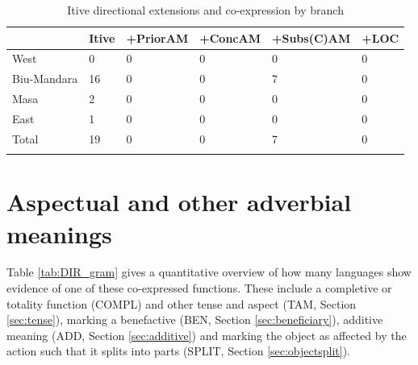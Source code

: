 \begin{table}
	\caption{Itive directional extensions and co-expression by branch}
	\label{tab:itive_plusTABLE}
	\begin{tabular}{llllll} %
		\lsptoprule
		{} &  Itive &  +PriorAM &  +ConcAM &  +Subs(C)AM &  +LOC \\
		\midrule
		West &      0 &         0 &        0 &           0 &     0 \\
		Biu-Mandara &     16 &         0 &        0 &           7 &     0 \\
		Masa &      2 &         0 &        0 &           0 &     0 \\
		East &      1 &         0 &        0 &           0 &     0 \\
		\midrule
		Total &     19 &         0 &        0 &           7 &     0 \\
		\lspbottomrule
	\end{tabular}
\end{table}



\section{Aspectual and other adverbial meanings} \label{sec:cogrammatical2}

Table \ref{tab:DIR_gram} gives a quantitative overview of how many languages show evidence of one of these co-expressed functions. These include a completive or totality function (COMPL) and other tense and aspect (TAM, Section \ref{sec:tense}), marking a benefactive (BEN, Section \ref{sec:beneficiary}), additive meaning (ADD, Section \ref{sec:additive}) and marking the object as affected by the action such that it splits into parts (SPLIT, Section \ref{sec:objectsplit}).

